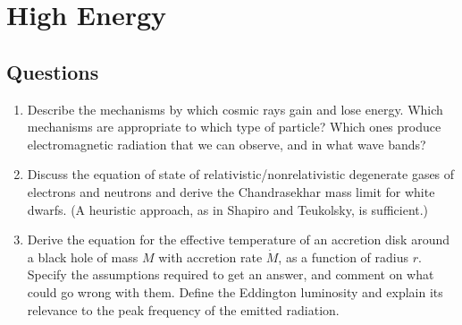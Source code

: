 \section{High Energy}
\subsection{Questions}
\begin{enumerate}
\item Describe the mechanisms by which cosmic rays gain and lose energy. Which mechanisms
      are appropriate to which type of particle? Which ones produce electromagnetic
      radiation that we can observe, and in what wave bands?
\item Discuss the equation of state of relativistic/nonrelativistic degenerate gases of electrons
      and neutrons and derive the Chandrasekhar mass limit for white dwarfs. (A
      heuristic approach, as in Shapiro and Teukolsky, is sufficient.)
\item Derive the equation for the effective temperature of an accretion disk around a
      black hole of mass $M$ with accretion rate $\dot M$, as a function of radius $r$. Specify the
      assumptions required to get an answer, and comment on what could go wrong with
      them. Define the Eddington luminosity and explain its relevance to the peak frequency
      of the emitted radiation.
\end{enumerate}
